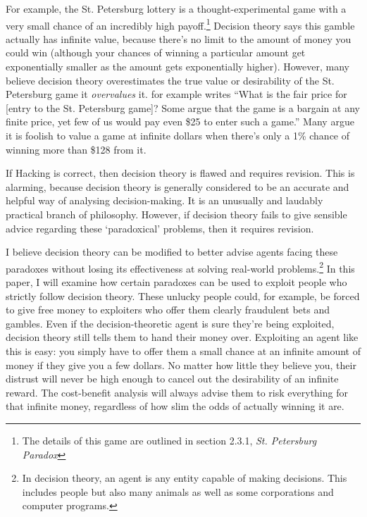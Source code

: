 \documentclass{article}
\begin{document}
For example, the St. Petersburg lottery is a thought-experimental game with a very small chance of an incredibly high payoff.\footnote{The details of this game are outlined in section 2.3.1, \textit{St. Petersburg Paradox}} Decision theory says this gamble actually has infinite value, because there's no limit to the amount of money you could win (although your chances of winning a particular amount get exponentially smaller as the amount gets exponentially higher). However, many believe decision theory overestimates the true value or desirability of the St. Petersburg game \textemdash{} it \textit{overvalues} it. \citet{hacking1980strange} for example writes ``What is the fair price for [entry to the St. Petersburg game]? Some argue that the game is a bargain at any finite price, yet few of us would pay even \$25 to enter such a game.'' Many argue it is foolish to value a game at infinite dollars when there's only a 1\% chance of winning more than \$128 from it.

If Hacking is correct, then decision theory is flawed and requires revision. This is alarming, because decision theory is generally considered to be an accurate and helpful way of analysing decision-making. It is an unusually and laudably practical branch of philosophy. However, if decision theory fails to give sensible advice regarding these `paradoxical' problems, then it requires revision. 

I believe decision theory can be modified to better advise agents facing these paradoxes without losing its effectiveness at solving real-world problems.\footnote{In decision theory, an agent is any entity capable of making decisions. This includes people but also many animals as well as some corporations and computer programs.} In this paper, I will examine how certain paradoxes can be used to exploit people who strictly follow decision theory. These unlucky people could, for example, be forced to give free money to exploiters who offer them clearly fraudulent bets and gambles. Even if the decision-theoretic agent is sure they're being exploited, decision theory still tells them to hand their money over. Exploiting an agent like this is easy: you simply have to offer them a small chance at an infinite amount of money if they give you a few dollars. No matter how little they believe you, their distrust will never be high enough to cancel out the desirability of an infinite reward. The cost-benefit analysis will always advise them to risk everything for that infinite money, regardless of how slim the odds of actually winning it are.
\end{document}
